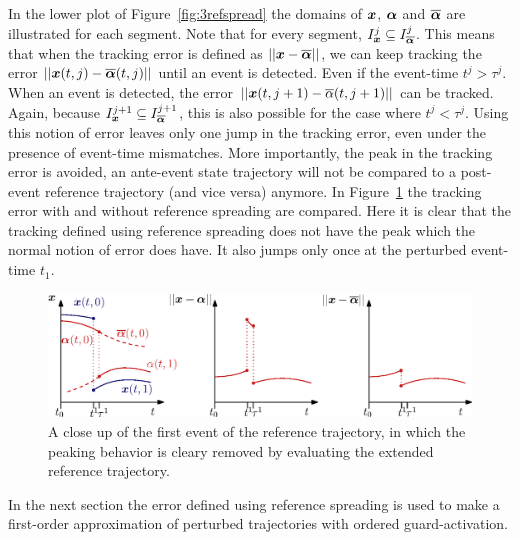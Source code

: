 \documentclass[../DC2017114Bouma.tex]{subfiles}
\begin{document}
In the lower plot of Figure~\ref{fig:3refspread} the domains of ${\boldsymbol{x}}$, $\boldsymbol{\alpha}$ and $\overline{\boldsymbol{\alpha}}$ are illustrated for each segment. Note that for every segment, $I_{{\boldsymbol{x}}}^j\subseteq I_{\overline{\boldsymbol{\alpha}}}^j$. This means that when the tracking error is defined as $||{\boldsymbol{x}}-\overline{\boldsymbol{\alpha}}||$, we can keep tracking the error $||{\boldsymbol{x}}(t,j)-\overline{\boldsymbol{\alpha}}(t,j)||$ until an event is detected. Even if the event-time $t^j>\tau^j$. When an event is detected, the error  $||{\boldsymbol{x}}(t,j+1)-\overline{\alpha}(t,j+1)||$ can be tracked. Again, because $I_{{\boldsymbol{x}}}^{j+1}\subseteq I_{\overline{\boldsymbol{\alpha}}}^{j+1}$, this is also possible for the case where $t^j<\tau^j$. Using this notion of error leaves only one jump in the tracking error, even under the presence of event-time mismatches. More importantly, the peak in the tracking error is avoided, an ante-event state trajectory will not be compared to a post-event reference trajectory (and vice versa) anymore. In Figure~\ref{fig:3refspreaderrors} the tracking error with and without reference spreading are compared. Here it is clear that the tracking defined using reference spreading does not have the peak which the normal notion of error does have. It also jumps only once at the perturbed event-time $t_1$.
\begin{figure}[h]
\centering
\includegraphics[width=\textwidth]{refspreaderrors.eps}\caption{A close up of the  first event of the reference trajectory, in which the peaking behavior is cleary removed by evaluating the extended reference trajectory.} \label{fig:3refspreaderrors}
\end{figure}

In the next section the error defined using reference spreading is used to make a first-order approximation of perturbed trajectories with ordered guard-activation.
\end{document}
